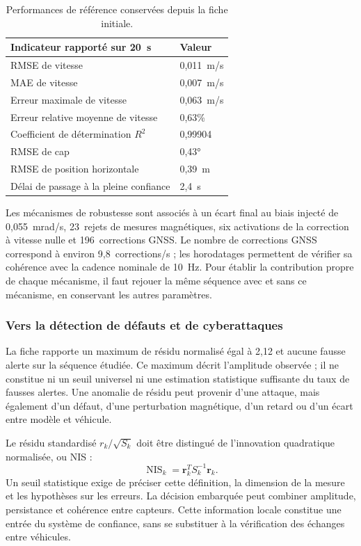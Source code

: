 \documentclass[11pt,a4paper]{article}
\begin{document}
\begin{table}[!htbp]\centering\small
\begin{tabularx}{\linewidth}{|Y|L{3.0cm}|}\hline
{}\textbf{Indicateur rapporté sur 20~s} & \textbf{Valeur}\\\hline
RMSE de vitesse & 0,011~m/s\\\hline
MAE de vitesse & 0,007~m/s\\\hline
Erreur maximale de vitesse & 0,063~m/s\\\hline
Erreur relative moyenne de vitesse & 0,63\%\\\hline
Coefficient de détermination $R^2$ & 0,99904\\\hline
RMSE de cap & 0,43°\\\hline
RMSE de position horizontale & 0,39~m\\\hline
Délai de passage à la pleine confiance & 2,4~s\\\hline
\end{tabularx}
\caption{Performances de référence conservées depuis la fiche initiale.}
\end{table}

Les mécanismes de robustesse sont associés à un écart final au biais injecté de 0,055~mrad/s, 23~rejets de mesures magnétiques, six activations de la correction à vitesse nulle et 196~corrections GNSS. Le nombre de corrections GNSS correspond à environ 9,8~corrections/s ; les horodatages permettent de vérifier sa cohérence avec la cadence nominale de 10~Hz. Pour établir la contribution propre de chaque mécanisme, il faut rejouer la même séquence avec et sans ce mécanisme, en conservant les autres paramètres.
\FloatBarrier

\subsubsection{Vers la détection de défauts et de cyberattaques}

La fiche rapporte un maximum de résidu normalisé égal à 2,12 et aucune fausse alerte sur la séquence étudiée. Ce maximum décrit l'amplitude observée ; il ne constitue ni un seuil universel ni une estimation statistique suffisante du taux de fausses alertes. Une anomalie de résidu peut provenir d'une attaque, mais également d'un défaut, d'une perturbation magnétique, d'un retard ou d'un écart entre modèle et véhicule.

Le résidu standardisé $r_k/\sqrt{S_k}$ doit être distingué de l'innovation quadratique normalisée, ou NIS :
\begin{equation}
\operatorname{NIS}_k=\boldsymbol{r}_k^T S_k^{-1}\boldsymbol{r}_k.
\end{equation}
Un seuil statistique exige de préciser cette définition, la dimension de la mesure et les hypothèses sur les erreurs. La décision embarquée peut combiner amplitude, persistance et cohérence entre capteurs. Cette information locale constitue une entrée du système de confiance, sans se substituer à la vérification des échanges entre véhicules.
\end{document}
